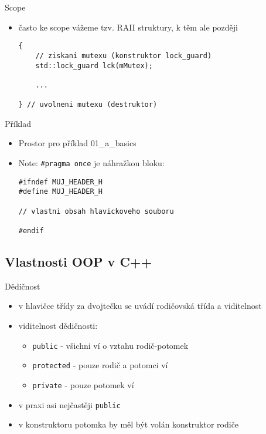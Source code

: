 \documentclass{beamer}
\begin{document}
\begin{xframe}{Scope}
	\begin{itemize}
		\item často ke scope vážeme tzv. RAII struktury, k těm ale později
		
\begin{lstlisting}[basicstyle=\fontsize{9}{10}\selectfont\ttfamily]
{
    // ziskani mutexu (konstruktor lock_guard)
    std::lock_guard lck(mMutex);

    ...

} // uvolneni mutexu (destruktor)
\end{lstlisting}
	\end{itemize}
\end{xframe}



\begin{xframe}{Příklad}
	\begin{itemize}
		\item Prostor pro příklad 01\_a\_basics
		
		\item Note: \texttt{\#pragma once} je náhražkou bloku:
		
\begin{lstlisting}[basicstyle=\fontsize{9}{10}\selectfont\ttfamily]
#ifndef MUJ_HEADER_H
#define MUJ_HEADER_H

// vlastni obsah hlavickoveho souboru

#endif
\end{lstlisting}
		
	\end{itemize}
\end{xframe}

\subsection{Vlastnosti OOP v C++}


\begin{xframe}{Dědičnost}
	\begin{itemize}
		\item v hlavičce třídy za dvojtečku se uvádí rodičovská třída a viditelnost
		\item viditelnost dědičnosti:
			\begin{itemize}
				\item \texttt{public} - všichni ví o vztahu rodič-potomek
				\item \texttt{protected} - pouze rodič a potomci ví
				\item \texttt{private} - pouze potomek ví
			\end{itemize}
		\item v praxi asi nejčastěji \texttt{public}
		\item v konstruktoru potomka by měl být volán konstruktor rodiče
	\end{itemize}
\end{xframe}
\end{document}
